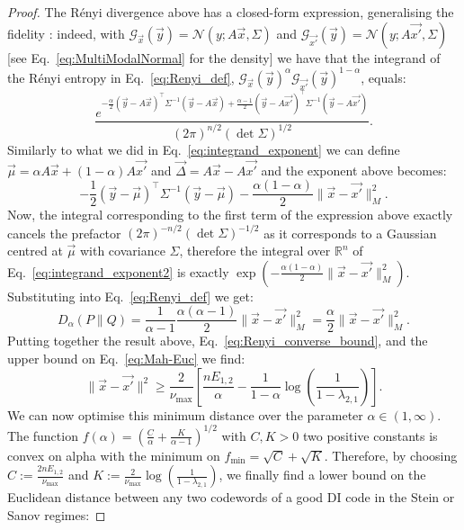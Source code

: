 \documentclass[10pt,conference]{IEEEtran}
\newcommand{\1}{\mathds{1}}
\newcommand{\RR}{\mathbb{R}}
\newcommand{\cG}{\mathcal{G}}
\newcommand{\cN}{\mathcal{N}}
\begin{document}
\begin{proof}
The R\'enyi divergence above has a closed-form expression, generalising the fidelity \cite{LieseVajda}: indeed, with $\cG_{\vec{x}}(\vec{y})=\cN(y;A\vec{x},\Sigma)$ and $\cG_{\vec{x'}}(\vec{y})=\cN(y;A\vec{x'},\Sigma)$ [see Eq.~\eqref{eq:MultiModalNormal} for the density] we have that the integrand of the R\'enyi entropy in Eq.~\eqref{eq:Renyi_def}, $\cG_{\vec{x}}(\vec{y})^\alpha \cG_{\vec{x'}}(\vec{y})^{1-\alpha}$, equals:
\begin{equation*}
  \frac{e^{-\frac{\alpha}{2} (\vec{y}-A\vec{x})^\top\Sigma^{-1}(\vec{y}-A\vec{x})+\frac{\alpha-1}{2}(\vec{y}-A\vec{x'})^\top\Sigma^{-1}(\vec{y}-A\vec{x'})}}{(2\pi)^{n/2}(\det\Sigma)^{1/2}}.
\end{equation*}
Similarly to what we did in Eq.~\eqref{eq:integrand_exponent} we can define $\vec{\mu}=\alpha A\vec{x}+(1-\alpha)A\vec{x'}$ and $\vec{\Delta}=A\vec{x}-A\vec{x'}$ and the exponent above becomes:
\begin{equation}
  \label{eq:integrand_exponent2}
  -\frac12(\vec{y}-\vec{\mu})^\top\Sigma^{-1}(\vec{y}-\vec{\mu})-\frac{\alpha(1-\alpha)}{2}\|\vec{x}-\vec{x'}\|_M^2.
\end{equation}
Now, the integral corresponding to the first term of the expression above exactly cancels the prefactor $(2\pi)^{-n/2}(\det\Sigma)^{-1/2}$ as it corresponds to a Gaussian centred at $\vec{\mu}$ with covariance $\Sigma$, therefore the integral over $\RR^n$ of Eq.~\eqref{eq:integrand_exponent2} is exactly $\exp\left(-\frac{\alpha(1-\alpha)}{2}\|\vec{x}-\vec{x'}\|_M^2\right)$. Substituting into Eq.~\eqref{eq:Renyi_def} we get:
\begin{equation*}
  D_\alpha(P\|Q)=\frac{1}{\alpha-1}\frac{\alpha(\alpha-1)}{2}\|\vec{x}-\vec{x'}\|_M^2=\frac{\alpha}{2}\|\vec{x}-\vec{x'}\|_M^2.
\end{equation*}
Putting together the result above, Eq.~\eqref{eq:Renyi_converse_bound}, and the upper bound on Eq.~\eqref{eq:Mah-Euc} we find:
\begin{equation}
  \label{eq:stein_radius}
  \|\vec{x}-\vec{x'}\|^2\geq\frac{2}{\nu_{\max}}\left[\frac{nE_{1,2}}{\alpha}-\frac{1}{1-\alpha}\log\left(\frac{1}{1-\lambda_{2,1}}\right)\right].
\end{equation}
We can now optimise this minimum distance over the parameter $\alpha\in(1,\infty)$. The function $f(\alpha)=(\frac{C}{\alpha}+\frac{K}{\alpha-1})^{1/2}$ with $C,K>0$ two positive constants is convex on alpha with the minimum on $f_{\min}=\sqrt{C}+\sqrt{K}$. Therefore, by choosing $C:=\frac{2nE_{1,2}}{\nu_{\max}}$ and $K:=\frac{2}{\nu_{\max}}\log\left(\frac{1}{1-\lambda_{2,1}}\right)$, we finally find a lower bound on the Euclidean distance between any two codewords of a good DI code in the Stein or Sanov regimes:

\end{proof}
\end{document}
